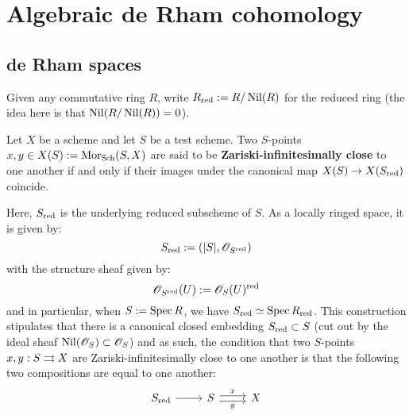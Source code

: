 \section{Algebraic de Rham cohomology}
    \subsection{de Rham spaces}
        \begin{convention}
            Given any commutative ring $R$, write $R_{\mathrm{red}} := R/\operatorname{Nil}(R)$ for the  reduced ring (the idea here is that $\operatorname{Nil}(R/\operatorname{Nil}(R)) = 0$).
        \end{convention}
    
        \begin{definition} \label{def: zariski_infinitesimally_close_points}
            Let $X$ be a scheme and let $S$ be a test scheme. Two $S$-points $x, y \in X(S) := \mathrm{Mor}_{\mathrm{Sch}}(S, X)$ are said to be \textbf{Zariski-infinitesimally close} to one another if and only if their images under the canonical map $X(S) \to X(S_{\mathrm{red}})$ coincide.
        \end{definition}
        Here, $S_{\mathrm{red}}$ is the underlying reduced subscheme of $S$. As a locally ringed space, it is given by:
            $$S_{\mathrm{red}} := (|S|, \mathscr{O}_{S^{\mathrm{red}}})$$
        with the structure sheaf given by:
            $$\mathscr{O}_{S^{\mathrm{red}}}(U) := \mathscr{O}_S(U)^{\mathrm{red}}$$
        and in particular, when $S := \operatorname{Spec} R$, we have $S_{\mathrm{red}} \simeq \operatorname{Spec} R_{\mathrm{red}}$. This construction stipulates that there is a canonical closed embedding $S_{\mathrm{red}} \subset S$ (cut out by the ideal sheaf $\operatorname{Nil}(\mathscr{O}_S) \subset \mathscr{O}_S$) and as such, the condition that two $S$-points $x, y: S \rightrightarrows X$ are Zariski-infinitesimally close to one another is that the following two compositions are equal to one another:
            $$
                \begin{tikzcd}
                {S_{\red}} & S & X
                \arrow[from=1-1, to=1-2]
                \arrow["y"', shift right, from=1-2, to=1-3]
                \arrow["x", shift left, from=1-2, to=1-3]
                \end{tikzcd}
            $$

